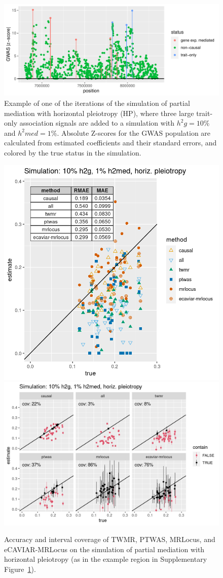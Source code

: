 \documentclass[11pt]{article}
\begin{document}
\begin{figure}[!ht]
  \centering
  \includegraphics[width=.7\textwidth]{figs/hp_example}
  \caption{Example of one of the iterations of the simulation of
    partial mediation with horizontal pleiotropy (HP), where three
    large trait-only association signals are added to a simulation
    with $h^2g = 10\%$ and $h^2med = 1\%$. Absolute Z-scores for the
    GWAS population are calculated from estimated coefficients and
    their standard errors, and colored by the true status in the
    simulation.}
  \label{sf:hp}
\end{figure}

\begin{figure}[!ht]
  \centering
  \includegraphics[width=.33\textwidth]{figs/simhp.png}
  \includegraphics[width=.5\textwidth]{figs/coverhp.png}
  \caption{Accuracy and interval coverage of TWMR, PTWAS, MRLocus, and
  eCAVIAR-MRLocus on the simulation of partial mediation with
  horizontal pleiotropy (as in the example region in Supplementary
  Figure~\ref{sf:hp}).}
\end{figure}
\end{document}
